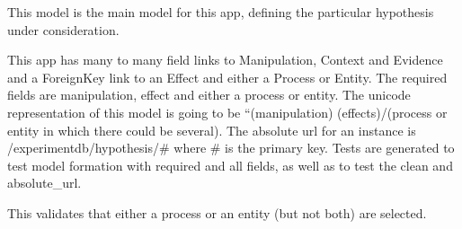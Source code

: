 \documentclass[letterpaper,10pt,english]{sphinxmanual}
\begin{document}
\begin{fulllineitems}
\label{api:experimentdb.hypotheses.models.Hypothesis}
This model is the main model for this app, defining the particular hypothesis under consideration.


This app has many to many field links to Manipulation, Context and Evidence and a ForeignKey link to an Effect and either a Process or Entity.  The required fields are manipulation, effect and either a process or entity.  The unicode representation of this model is going to be ``(manipulation) (effects)/(process or entity in which there could be several).  The absolute url for an instance is /experimentdb/hypothesis/\# where \# is the primary key.  Tests are generated to test model formation with required and all fields, as well as to test the clean and absolute\_url.


\begin{fulllineitems}
\label{api:experimentdb.hypotheses.models.Hypothesis.DoesNotExist}
\end{fulllineitems}


\begin{fulllineitems}
\label{api:experimentdb.hypotheses.models.Hypothesis.MultipleObjectsReturned}
\end{fulllineitems}


\begin{fulllineitems}
\label{api:experimentdb.hypotheses.models.Hypothesis.clean}
This validates that either a process or an entity (but not both) are selected.


\end{fulllineitems}


\begin{fulllineitems}
\label{api:experimentdb.hypotheses.models.Hypothesis.context}
\end{fulllineitems}


\end{fulllineitems}
\end{document}
